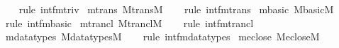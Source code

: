 \begin{isabellebody}
%
\isadelimproof
\ \ %
\endisadelimproof
%
\isatagproof
{}\isamarkupfalse%
\ {\isacharparenleft}{\kern0pt}rule\ intf{\isachardot}{\kern0pt}mtriv{\isacharparenright}{\kern0pt}%
\endisatagproof
{\isafoldproof}%
%
\isadelimproof
\isanewline
%
\endisadelimproof
\isanewline
{}\isamarkupfalse%
\ mtrans{\isacharcolon}{\kern0pt}\ {\isachardoublequoteopen}M{\isacharunderscore}{\kern0pt}trans{\isacharparenleft}{\kern0pt}{\isacharhash}{\kern0pt}{\isacharhash}{\kern0pt}M{\isacharparenright}{\kern0pt}{\isachardoublequoteclose}\isanewline
%
\isadelimproof
\ \ %
\endisadelimproof
%
\isatagproof
{}\isamarkupfalse%
\ {\isacharparenleft}{\kern0pt}rule\ intf{\isachardot}{\kern0pt}mtrans{\isacharparenright}{\kern0pt}%
\endisatagproof
{\isafoldproof}%
%
\isadelimproof
\isanewline
%
\endisadelimproof
\isanewline
{}\isamarkupfalse%
\ mbasic{\isacharcolon}{\kern0pt}\ {\isachardoublequoteopen}M{\isacharunderscore}{\kern0pt}basic{\isacharparenleft}{\kern0pt}{\isacharhash}{\kern0pt}{\isacharhash}{\kern0pt}M{\isacharparenright}{\kern0pt}{\isachardoublequoteclose}\isanewline
%
\isadelimproof
\ \ %
\endisadelimproof
%
\isatagproof
{}\isamarkupfalse%
\ {\isacharparenleft}{\kern0pt}rule\ intf{\isachardot}{\kern0pt}mbasic{\isacharparenright}{\kern0pt}%
\endisatagproof
{\isafoldproof}%
%
\isadelimproof
\isanewline
%
\endisadelimproof
\isanewline
{}\isamarkupfalse%
\ mtrancl{\isacharcolon}{\kern0pt}\ {\isachardoublequoteopen}M{\isacharunderscore}{\kern0pt}trancl{\isacharparenleft}{\kern0pt}{\isacharhash}{\kern0pt}{\isacharhash}{\kern0pt}M{\isacharparenright}{\kern0pt}{\isachardoublequoteclose}\isanewline
%
\isadelimproof
\ \ %
\endisadelimproof
%
\isatagproof
{}\isamarkupfalse%
\ {\isacharparenleft}{\kern0pt}rule\ intf{\isachardot}{\kern0pt}mtrancl{\isacharparenright}{\kern0pt}%
\endisatagproof
{\isafoldproof}%
%
\isadelimproof
\isanewline
%
\endisadelimproof
\isanewline
{}\isamarkupfalse%
\ mdatatypes{\isacharcolon}{\kern0pt}\ {\isachardoublequoteopen}M{\isacharunderscore}{\kern0pt}datatypes{\isacharparenleft}{\kern0pt}{\isacharhash}{\kern0pt}{\isacharhash}{\kern0pt}M{\isacharparenright}{\kern0pt}{\isachardoublequoteclose}\isanewline
%
\isadelimproof
\ \ %
\endisadelimproof
%
\isatagproof
{}\isamarkupfalse%
\ {\isacharparenleft}{\kern0pt}rule\ intf{\isachardot}{\kern0pt}mdatatypes{\isacharparenright}{\kern0pt}%
\endisatagproof
{\isafoldproof}%
%
\isadelimproof
\isanewline
%
\endisadelimproof
\isanewline
{}\isamarkupfalse%
\ meclose{\isacharcolon}{\kern0pt}\ {\isachardoublequoteopen}M{\isacharunderscore}{\kern0pt}eclose{\isacharparenleft}{\kern0pt}{\isacharhash}{\kern0pt}{\isacharhash}{\kern0pt}M{\isacharparenright}{\kern0pt}{\isachardoublequoteclose}\isanewline

\end{isabellebody}
